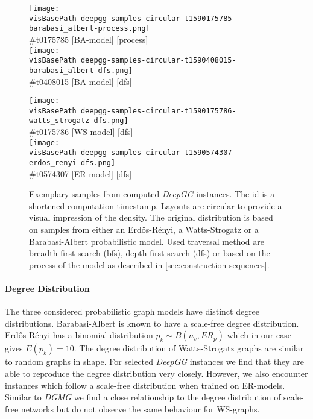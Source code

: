\documentclass{article}
\newcommand{\visBasePath}[0]{vis/}
\begin{document}
\begin{figure*}
  \begin{minipage}[c]{0.49\linewidth}
	\centering
    \texttt{[image: \\visBasePath deepgg-samples-circular-t1590175785-barabasi\_albert-process.png]}\\
	{\color{gray}\small\#t0175785 [BA-model] [process]}\protect\\
    \texttt{[image: \\visBasePath deepgg-samples-circular-t1590408015-barabasi\_albert-dfs.png]}\\
	{\color{gray}\small\#t0408015 [BA-model] [dfs]}
  \end{minipage}\hfill
  \begin{minipage}[c]{0.49\linewidth}
	\centering
    \texttt{[image: \\visBasePath deepgg-samples-circular-t1590175786-watts\_strogatz-dfs.png]}\\
	{\color{gray}\small\#t0175786 [WS-model] [dfs]}\protect\\
    \texttt{[image: \\visBasePath deepgg-samples-circular-t1590574307-erdos\_renyi-dfs.png]}\\
	{\color{gray}\small\#t0574307 [ER-model] [dfs]}\protect\\
  \end{minipage}
  \caption{
    Exemplary samples from computed \textit{DeepGG} instances.
	The id is a shortened computation timestamp.
	Layouts are circular to provide a visual impression of the density.
	The original distribution is based on samples from either an Erdős-Rényi, a Watts-Strogatz or a Barabasi-Albert probabilistic model.
	Used traversal method are breadth-first-search (bfs), depth-first-search (dfs) or based on the process of the model as described in \autoref{sec:construction-sequences}.
  } \label{fig:samples}
\end{figure*}

\paragraph{Degree Distribution} The three considered probabilistic graph models have distinct degree distributions.
Barabasi-Albert is known to have a scale-free degree distribution.
Erdős-Rényi has a binomial distribution $p_k \sim B(n_v, ER_p)$ which in our case gives $E(p_k) = 10$.
The degree distribution of Watts-Strogatz graphs are similar to random graphs in shape.
For selected \textit{DeepGG} instances we find that they are able to reproduce the degree distribution very closely.
However, we also encounter instances which follow a scale-free distribution when trained on ER-models.
Similar to \textit{DGMG} we find a close relationship to the degree distribution of scale-free networks but do not observe the same behaviour for WS-graphs.
\end{document}
